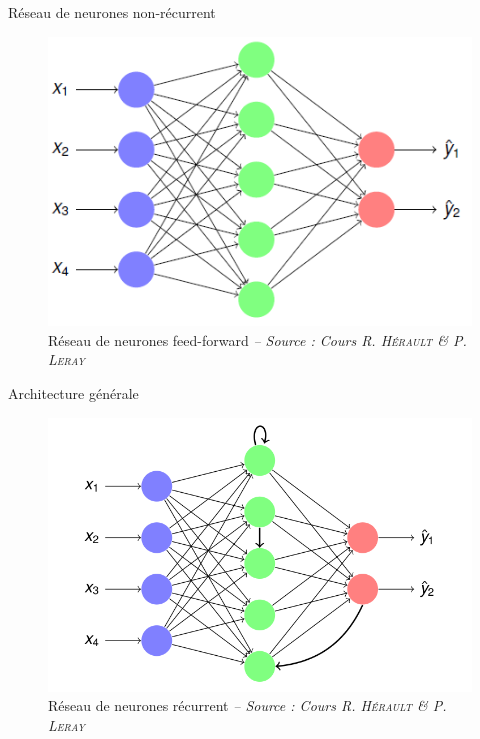 \begin{frame}{Réseau de neurones non-récurrent}
    \begin{figure}
        \includegraphics[height=.75\textheight,width=\textwidth,keepaspectratio]{images/arch_nn}
        \caption{Réseau de neurones feed-forward {\scriptsize\it -- Source : Cours R. \textsc{Hérault} \& P. \textsc{Leray}}}
    \end{figure}
    
\end{frame}


\begin{frame}{Architecture générale}
    \begin{figure}
        \includegraphics[height=.75\textheight,width=\textwidth,keepaspectratio]{images/arch_rnn_1}
        \caption{Réseau de neurones récurrent {\scriptsize\it -- Source : Cours R. \textsc{Hérault} \& P. \textsc{Leray}}}
    \end{figure}

\end{frame}


